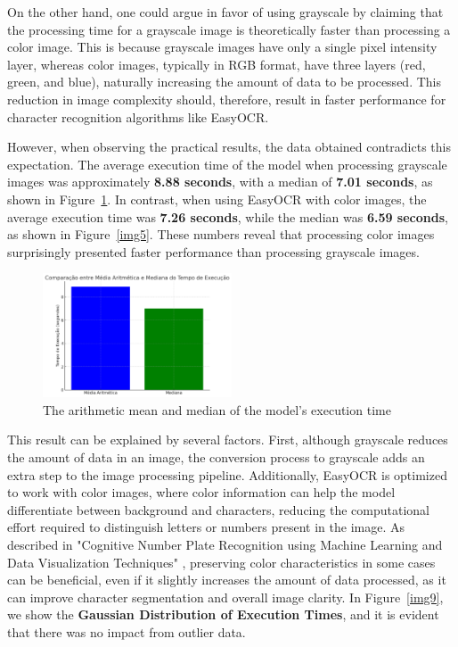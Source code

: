 \documentclass[conference]{IEEEtran}
\begin{document}
    On the other hand, one could argue in favor of using grayscale by claiming that the processing time for a grayscale image is theoretically faster than processing a color image. This is because grayscale images have only a single pixel intensity layer, whereas color images, typically in RGB format, have three layers (red, green, and blue), naturally increasing the amount of data to be processed. This reduction in image complexity should, therefore, result in faster performance for character recognition algorithms like EasyOCR.
    
    However, when observing the practical results, the data obtained contradicts this expectation. The average execution time of the model when processing grayscale images was approximately \textbf{8.88 seconds}, with a median of \textbf{7.01 seconds}, as shown in Figure~\ref{img8}. In contrast, when using EasyOCR with color images, the average execution time was \textbf{7.26 seconds}, while the median was \textbf{6.59 seconds}, as shown in Figure~\ref{img5}. These numbers reveal that processing color images surprisingly presented faster performance than processing grayscale images.
    
    \begin{figure}[htbp]
        \centerline{\includegraphics[width=0.5\textwidth]{img8.png}}
        \caption{The arithmetic mean and median of the model's execution time}
        \label{img8}
    \end{figure}
    
    This result can be explained by several factors. First, although grayscale reduces the amount of data in an image, the conversion process to grayscale adds an extra step to the image processing pipeline. Additionally, EasyOCR is optimized to work with color images, where color information can help the model differentiate between background and characters, reducing the computational effort required to distinguish letters or numbers present in the image. As described in "Cognitive Number Plate Recognition using Machine Learning and Data Visualization Techniques" \cite{b6}, preserving color characteristics in some cases can be beneficial, even if it slightly increases the amount of data processed, as it can improve character segmentation and overall image clarity. In Figure~\ref{img9}, we show the \textbf{Gaussian Distribution of Execution Times}, and it is evident that there was no impact from outlier data.
    
\end{document}

